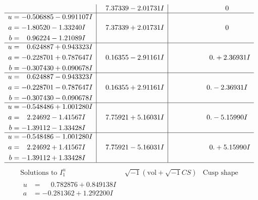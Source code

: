 \documentclass[1p]{elsarticle_modified}
\theoremstyle{definition}
\newcommand{\I}{\sqrt{-1}}
\begin{document}
$$\begin{array}{c|c|c}
 & \phantom{-}7.37339 - 2.01731 I & \phantom{-0.000000 } 0 \\ \hline\begin{aligned}
u &= -0.506885 - 0.991107 I \\
a &= -1.80520 - 1.33240 I \\
b &= \phantom{-}0.96224 - 1.21089 I\end{aligned}
 & \phantom{-}7.37339 + 2.01731 I & \phantom{-0.000000 } 0 \\ \hline\begin{aligned}
u &= \phantom{-}0.624887 + 0.943323 I \\
a &= -0.228701 + 0.787647 I \\
b &= -0.307430 + 0.090678 I\end{aligned}
 & \phantom{-}0.16355 - 2.91161 I & \phantom{-0.000000 -}0. + 2.36931 I \\ \hline\begin{aligned}
u &= \phantom{-}0.624887 - 0.943323 I \\
a &= -0.228701 - 0.787647 I \\
b &= -0.307430 - 0.090678 I\end{aligned}
 & \phantom{-}0.16355 + 2.91161 I & \phantom{-0.000000 } 0. - 2.36931 I \\ \hline\begin{aligned}
u &= -0.548486 + 1.001280 I \\
a &= \phantom{-}2.24692 - 1.41567 I \\
b &= -1.39112 - 1.33428 I\end{aligned}
 & \phantom{-}7.75921 + 5.16031 I & \phantom{-0.000000 } 0. - 5.15990 I \\ \hline\begin{aligned}
u &= -0.548486 - 1.001280 I \\
a &= \phantom{-}2.24692 + 1.41567 I \\
b &= -1.39112 + 1.33428 I\end{aligned}
 & \phantom{-}7.75921 - 5.16031 I & \phantom{-0.000000 -}0. + 5.15990 I\\
 \hline 
 \end{array}$$\newpage$$\begin{array}{c|c|c}  
\text{Solutions to }I^u_{1}& \I (\text{vol} + \sqrt{-1}CS) & \text{Cusp shape}\\
 \hline 
\begin{aligned}
u &= \phantom{-}0.782876 + 0.849138 I \\
a &= -0.281362 + 1.292200 I \\

\end{aligned}
\end{array}$$
\end{document}
